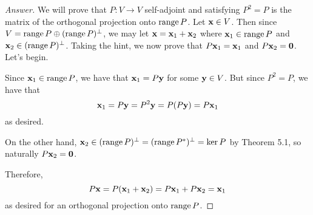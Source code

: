 \documentclass[../psets.tex]{subfiles}
\begin{document}
\begin{enumerate}[label={\textbf{5.\arabic*.}}]
    \begin{proof}[Answer]
        We will prove that $P:V\to V$ self-adjoint and satisfying $P^2=P$ is the matrix of the orthogonal projection onto $\operatorname{range} P$. Let $\mathbf{x}\in V$. Then since $V=\operatorname{range} P\oplus(\operatorname{range} P)^\perp$, we may let $\mathbf{x}=\mathbf{x}_1+\mathbf{x}_2$ where $\mathbf{x}_1\in\operatorname{range} P$ and $\mathbf{x}_2\in(\operatorname{range} P)^\perp$. Taking the hint, we now prove that $P\mathbf{x}_1=\mathbf{x}_1$ and $P\mathbf{x}_2=\bm{0}$. Let's begin.\par
        Since $\mathbf{x}_1\in\operatorname{range} P$, we have that $\mathbf{x}_1=P\mathbf{y}$ for some $\mathbf{y}\in V$. But since $P^2=P$, we have that
        \begin{equation*}
            \mathbf{x}_1 = P\mathbf{y} = P^2\mathbf{y} = P(P\mathbf{y}) = P\mathbf{x}_1
        \end{equation*}
        as desired.\par
        On the other hand, $\mathbf{x}_2\in(\operatorname{range} P)^\perp=(\operatorname{range} P^*)^\perp=\ker P$ by Theorem 5.1, so naturally $P\mathbf{x}_2=\bm{0}$.\par
        Therefore,
        \begin{equation*}
            P\mathbf{x} = P(\mathbf{x}_1+\mathbf{x}_2) = P\mathbf{x}_1+P\mathbf{x}_2 = \mathbf{x}_1
        \end{equation*}
        as desired for an orthogonal projection onto $\operatorname{range} P$.
    \end{proof}
\end{enumerate}
\end{document}
